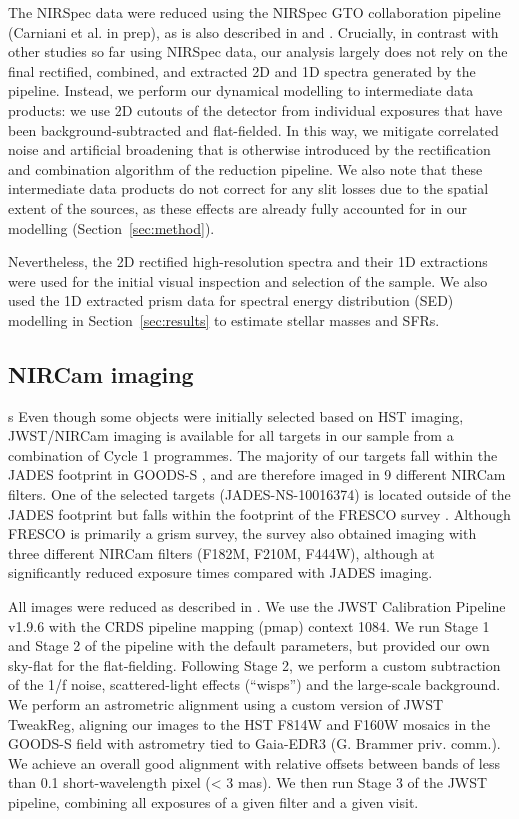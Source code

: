 \documentclass[longauth]{aa}
\begin{document}
The NIRSpec data were reduced using the NIRSpec GTO collaboration pipeline (Carniani et al. in prep), as is also described in \citet{CurtisLake2023} and \citet{Bunker2023}. Crucially, in contrast with other studies so far using NIRSpec data, our analysis largely does not rely on the final rectified, combined, and extracted 2D and 1D spectra generated by the pipeline. Instead, we perform our dynamical modelling to intermediate data products: we use 2D cutouts of the detector from individual exposures that have been background-subtracted and flat-fielded. In this way, we mitigate correlated noise and artificial broadening that is otherwise introduced by the rectification and combination algorithm of the reduction pipeline. We also note that these intermediate data products do not correct for any slit losses due to the spatial extent of the sources, as these effects are already fully accounted for in our modelling (Section~\ref{sec:method}).

Nevertheless, the 2D rectified high-resolution spectra and their 1D extractions were used for the initial visual inspection and selection of the sample. We also used the 1D extracted prism data for spectral energy distribution (SED) modelling in Section~\ref{sec:results} to estimate stellar masses and SFRs.



\subsection{NIRCam imaging}\label{sec:nircam}
s
Even though some objects were initially selected based on HST imaging, JWST/NIRCam imaging is available for all targets in our sample from a combination of Cycle 1 programmes. The majority of our targets fall within the JADES footprint in GOODS-S \citep{Rieke2023}, and are therefore imaged in 9 different NIRCam filters. %
One of the selected targets (JADES-NS-10016374) is located outside of the JADES footprint but falls within the footprint of the FRESCO survey \citep[programme 1895, PI P. Oesch;][]{FRESCO2023}. Although FRESCO is primarily a grism survey, the survey also obtained imaging with three different NIRCam filters (F182M, F210M, F444W), although at significantly reduced exposure times compared with JADES imaging. 

All images were reduced as described in \citet{Rieke2023}. We use the JWST Calibration Pipeline v1.9.6 with the CRDS pipeline mapping (pmap) context 1084. We run Stage 1 and Stage 2 of the pipeline with the default parameters, but provided our own sky-flat for the flat-fielding. Following Stage 2, we perform a custom subtraction of the 1/f noise, scattered-light effects (“wisps”) and the large-scale background. We perform an astrometric alignment using a custom version of JWST TweakReg, aligning our images to the HST F814W and F160W mosaics in the GOODS-S field with astrometry tied to Gaia-EDR3 (G. Brammer priv. comm.). We achieve an overall good alignment with relative offsets between bands of less than 0.1 short-wavelength pixel (< 3 mas). We then run Stage 3 of the JWST pipeline, combining all exposures of a given filter and a given visit.
\end{document}
